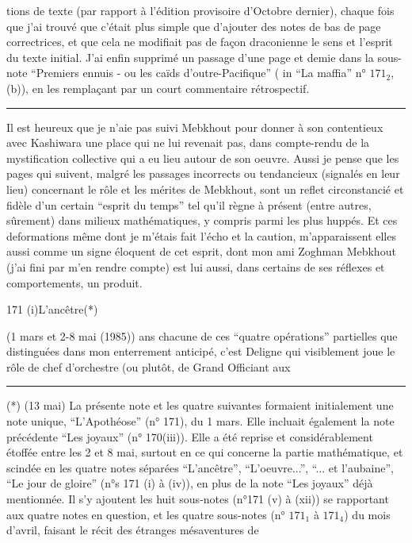 
tions de texte (par rapport à l'édition provisoire d'Octobre dernier), chaque fois que j'ai trouvé que c'était plus simple que d'ajouter des notes de bas de page correctrices, et que cela ne modifiait pas de façon draconienne le sens et l'esprit du texte initial. J'ai enfin supprimé un passage d'une page et demie dans la sous-note ``Premiers ennuis - ou les caïds d'outre-Pacifique'' ( in ``La maffia'' n° $171_2$, (b)), en les remplaçant par un court commentaire rétrospectif.

\noindent\rule{2cm}{0.4pt}

Il est heureux que je n'aie pas suivi Mebkhout\deleted{\unsure{,}} pour donner à son contentieux avec Kashiwara une place qui ne lui revenait pas, dans   compte-rendu de la mystification collective  qui a eu lieu autour de son oeuvre. Aussi je pense que les pages qui suivent, malgré les passages incorrects ou tendancieux (signalés en leur lieu) concernant le rôle et les mérites de Mebkhout,  sont  un reflet circonstancié et fidèle d'un certain ``esprit du temps'' tel qu'il règne à présent (entre autres, sûrement) dans   milieux mathématiques, y compris parmi les plus huppés. \handwritten{\unsure{(}}Et ces deformations même dont je m'étais fait l'écho et la caution, m'apparaissent elles aussi comme un signe éloquent de cet esprit, dont mon ami Zoghman Mebkhout\deleted{\unsure{,}}  (j'ai fini par m'en rendre compte)  est lui aussi, dans certains de ses réflexes et comportements, un produit.

\handwritten{(}171 (i)\handwritten{)}\quad L'ancêtre\quad (*)

(1 mars et 2-8 mai (1985))  ans chacune de ces ``quatre opérations'' partielles que  distinguées dans mon enterrement anticipé, c'est Deligne qui visiblement joue le rôle de chef d'orchestre (ou plutôt, de Grand Officiant aux

\noindent\rule{2cm}{0.4pt}

(*\deleted{\unsure{*}}) (13 mai) La présente note et les quatre suivantes formaient initialement une note unique, ``L'Apothéose'' (n° 171), du 1 mars. Elle incluait également la note précédente ``Les joyaux'' (n° 170(iii)). Elle a été reprise et considérablement étoffée entre les 2 et 8 mai, surtout en ce qui concerne la partie mathématique, et scindée en les quatre notes séparées ``L'ancêtre'', ``L'oeuvre...'', ``... et l'aubaine'', ``Le jour de gloire'' (n°s 171 (i) à (iv)), en plus de la note ``Les joyaux'' déjà mentionnée. Il s'y ajoutent les huit sous-notes (n°171 (v) à (xii)) se rapportant aux quatre notes en question, et les quatre sous-notes (n° $171_1$ à $171_4$) du mois d'avril, faisant le récit des étranges mésaventures de
